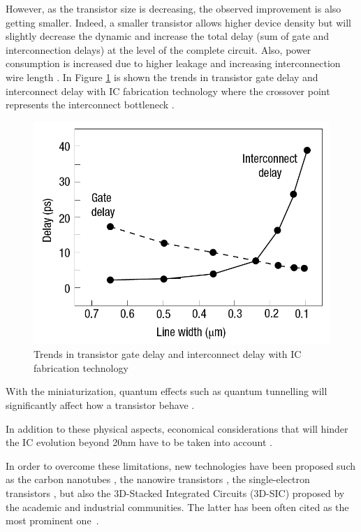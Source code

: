 However, as the transistor size is decreasing, the observed improvement is also getting smaller. Indeed, a smaller transistor allows higher device density but will slightly decrease the dynamic and increase the total delay (sum of gate and interconnection delays) at the level of the complete circuit. Also, power consumption is increased due to higher leakage and increasing interconnection wire length \cite{5227192}. In Figure \ref{fig:delaygateinterconnect} is shown the trends in transistor gate delay and interconnect delay with IC fabrication technology where the crossover point represents the interconnect bottleneck \cite{kirchain2007}.

\begin{figure}
\begin{center}
\includegraphics[width=0.75\linewidth]{delaygateinterconnect}
\end{center}
\caption{Trends in transistor gate delay and interconnect delay with IC fabrication technology \cite{kirchain2007}}
\label{fig:delaygateinterconnect}
\end{figure}

With the miniaturization, quantum effects such as quantum tunnelling will significantly affect how a transistor behave \cite{1240081}.

In addition to these physical aspects, economical considerations that will hinder the IC evolution beyond 20nm have to be taken into account \cite{5227192,PFF10}.

In order to overcome these limitations, new technologies have been proposed such as the carbon nanotubes \cite{tans1998room}, the nanowire transistors \cite{doi:10.1021/nl025875l}, the single-electron transistors \cite{citeulike:4194929}, but also the 3D-Stacked Integrated Circuits (3D-SIC) proposed by the academic and industrial communities. The latter has been often cited as the most prominent one~\cite{659500}.

